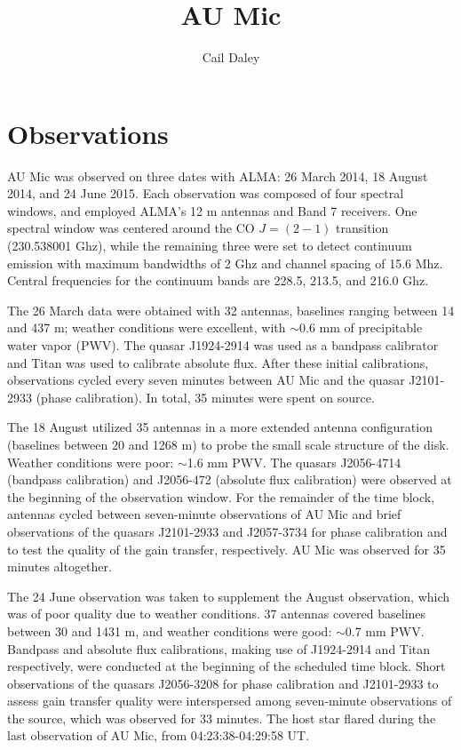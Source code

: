 \documentclass[11pt,modern]{aastex6}
\begin{document}
\title{AU Mic}

\author{Cail Daley}


\section{Observations}

AU Mic was observed on three dates with ALMA: 26 March 2014, 18 August 2014, and
24 June 2015. Each observation was composed of four spectral windows, and
employed ALMA's 12 m antennas and Band 7 receivers. One spectral window was
centered around the CO $J = (2-1)$ transition (230.538001 Ghz),
while the remaining three were set to detect continuum emission with
maximum bandwidths of 2 Ghz and channel spacing of 15.6 Mhz. Central frequencies
for the continuum bands are 228.5, 213.5, and 216.0 Ghz.

The 26 March data were obtained with 32 antennas, baselines ranging between
14 and 437 m; weather conditions were excellent, with $\sim$0.6 mm of precipitable
water vapor (PWV). The quasar J1924-2914 was used as a bandpass calibrator and Titan
was used to calibrate absolute flux. After these initial calibrations,
observations cycled every seven minutes between AU Mic and the quasar
J2101-2933 (phase calibration). In total, 35 minutes were
spent on source.

The 18 August utilized 35 antennas in a more extended antenna configuration
(baselines between 20 and 1268 m) to probe the small scale structure of the
disk. Weather conditions were poor: $\sim$1.6 mm PWV. The quasars J2056-4714
(bandpass calibration) and J2056-472 (absolute flux calibration) were observed
at the beginning of the observation window. For the remainder of the time block,
antennas cycled between seven-minute observations of AU Mic and brief
observations of the quasars J2101-2933 and J2057-3734 for phase calibration and
to test the quality of the gain transfer, respectively. AU Mic was observed for
35 minutes altogether.

The 24 June observation was taken to supplement the August observation, which was of
poor quality due to weather conditions. 37 antennas covered baselines between 30 and
1431 m, and weather conditions were good: $\sim$0.7 mm PWV. Bandpass and absolute flux calibrations, making use of J1924-2914 and
Titan respectively, were conducted at the beginning of the scheduled time block.
Short observations of the quasars J2056-3208 for phase calibration and
J2101-2933 to assess gain transfer quality were interspersed among
seven-minute observations of the source, which was observed for 33 minutes. The
host star flared during the last observation of AU Mic, from 04:23:38-04:29:58
UT.
\end{document}
